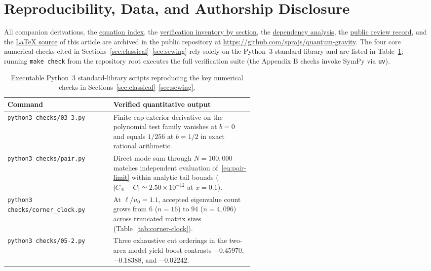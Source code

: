 \documentclass[10pt,a4paper]{article}
\numberwithin{equation}{section}
\newcommand{\repo}[2]{\href{https://github.com/sprajs/quantum-gravity/blob/main/#1}{#2}}
\begin{document}
\section{Reproducibility, Data, and Authorship Disclosure}
\label{sec:repro}

All companion derivations, the \repo{EQUATIONS.md}{equation index}, the \repo{audit/verification-scope.md}{verification inventory by section}, the \repo{audit/dependencies.md}{dependency analysis}, the \repo{reviews/README.md}{public review record}, and the \repo{docs/paper.tex}{LaTeX source} of this article are archived in the public repository at \url{https://github.com/sprajs/quantum-gravity}.
The four core numerical checks cited in Sections~\ref{sec:classical}--\ref{sec:sewing} rely solely on the Python~3 standard library and are listed in Table~\ref{tab:repro}; running \texttt{make check} from the repository root executes the full verification suite (the Appendix B checks invoke SymPy via \texttt{uv}).

\begin{table}[htbp]
\centering
\caption{Executable Python~3 standard-library scripts reproducing the key numerical checks in Sections~\ref{sec:classical}--\ref{sec:sewing}.}
\label{tab:repro}
\small
\begin{tabular}{@{} l >{\raggedright\arraybackslash}p{0.58\linewidth} @{}}
\toprule
Command & Verified quantitative output \\
\midrule
\texttt{python3 checks/03-3.py} & Finite-cap exterior derivative on the polynomial test family vanishes at $b=0$ and equals $1/256$ at $b=1/2$ in exact rational arithmetic. \\
\addlinespace[4pt]
\texttt{python3 checks/pair.py} & Direct mode sum through $N=100{,}000$ matches independent evaluation of~\eqref{eq:pair-limit} within analytic tail bounds ($|C_N-C|\simeq 2.50\times 10^{-12}$ at $x=0.1$). \\
\addlinespace[4pt]
\texttt{python3 checks/corner\_clock.py} & At $\ell/u_0=1.1$, accepted eigenvalue count grows from $6$ ($n=16$) to $94$ ($n=4{,}096$) across truncated matrix sizes (Table~\ref{tab:corner-clock}). \\
\addlinespace[4pt]
\texttt{python3 checks/05-2.py} & Three exhaustive cut orderings in the two-area model yield boost contrasts $-0.45970$, $-0.18388$, and $-0.02242$. \\
\bottomrule
\end{tabular}
\end{table}
\end{document}

